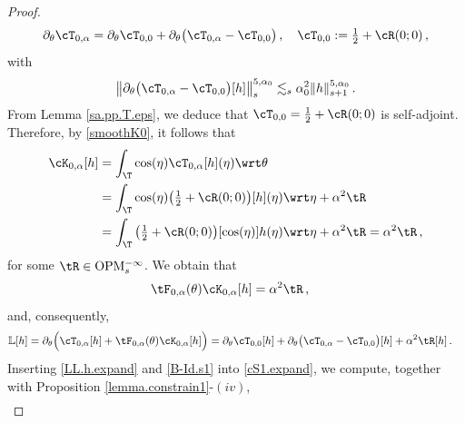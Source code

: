 \documentclass[a4paper,reqno,10pt]{article}
\newcommand{\pa}{\partial}
\newcommand{\OpM}{{\rm O}{\rm P}{\rm M}}
\begin{document}
\begin{proof}
\begin{equation}
    \pa_{\theta}\cT_{0,\alpha} = \pa_{\theta}\cT_{0,0} + \pa_{\theta}\big(\cT_{0,\alpha} -\cT_{0,0}\big)\,, \quad \cT_{0,0}:=\tfrac12 + \cR(0;0)\,,
\end{equation}
with
\begin{equation}
    \big\| \pa_{\theta}\big(\cT_{0,\alpha} - \cT_{0,0}\big)[h]\big\|_{s}^{5,\alpha_{0}} \lesssim_{s} \alpha_{0}^2 \| h \|_{s+1}^{5,\alpha_{0}} \,.
\end{equation}
    From Lemma \ref{sa.pp.T.eps}, we deduce that $\cT_{0,0}=\tfrac12 +\cR(0;0)$ is self-adjoint. Therefore, by \eqref{smoothK0}, it follows that 
	\begin{align}
		\cK_{0,\alpha}[h] & = \int_{\T} \cos(\eta) \cT_{0,\alpha}[h](\eta) \wrt\theta \\
        &= \int_{\T} \cos(\eta) \big(\tfrac12 + \cR(0;0)\big)[h](\eta) \wrt\eta + \alpha^2 \tR \\ 
		& = \int_{\T}  \big(\tfrac12 + \cR(0;0)\big)[ \cos(\eta)] h(\eta) \wrt\eta + \alpha^2 \tR = \alpha^2 \tR \,,
	\end{align}
    for some $\tR \in\OpM_{s}^{-\infty}$. We obtain that
    \begin{align}
		\tF_{0,\alpha}(\theta)\cK_{0,\alpha}[h]
        &= \alpha^2 \tR \,,\label{smoothKM0L}
	\end{align}
    and, consequently,
    \begin{align}
    \mathbb{L} [h]&=\partial_\theta\Big( \cT_{0,\alpha}[h]+\tF_{0,\alpha}(\theta)\cK_{0,\alpha}[h]\Big)  = \pa_{\theta}\cT_{0,0}[h]+ \pa_{\theta}\big( \cT_{0,\alpha}-\cT_{0,0} \big) [h]+ \alpha^2 \tR[h] \,.\label{LL.h.expand}
    \end{align}
    Inserting \eqref{LL.h.expand} and \eqref{B-Id.s1} into \eqref{cS1.expand}, we compute, together with Proposition \ref{lemma.constrain1}-$(iv)$,
    \begin{align}

\end{align}
\end{proof}
\end{document}
